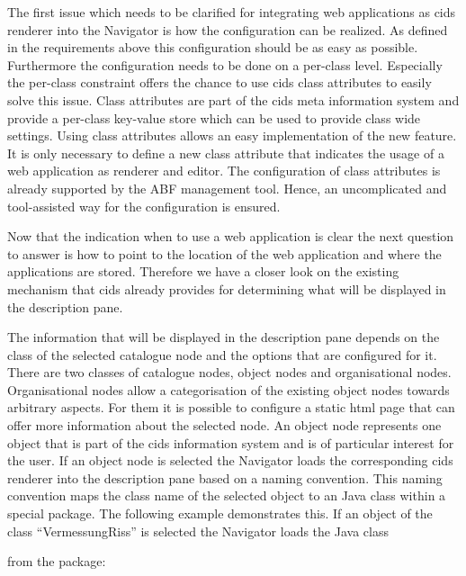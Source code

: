 The first issue which needs to be clarified for integrating web applications as cids renderer into the Navigator is how the configuration can be realized.
As defined in the requirements above this configuration should be as easy as possible.
Furthermore the configuration needs to be done on a per-class level.
Especially the per-class constraint offers the chance to use cids class attributes to easily solve this issue.
Class attributes are part of the cids meta information system and provide a per-class key-value store which can be used to provide class wide settings.
Using class attributes allows an easy implementation of the new feature.
It is only necessary to define a new class attribute that indicates the usage of a web application as renderer and editor.
The configuration of class attributes is already supported by the ABF management tool.
Hence, an uncomplicated and tool-assisted way for the configuration is ensured.

Now that the indication when to use a web application is clear the next question to answer is how to point to the location of the web application and where the applications are stored. Therefore we have a closer look on the existing mechanism that cids already provides for determining what will be displayed in the description pane.

The information that will be displayed in the description pane depends on the class of the selected catalogue node and the options that are configured for it.
There are two classes of catalogue nodes, object nodes and organisational nodes. Organisational nodes allow a categorisation of the existing object nodes towards arbitrary aspects.
For them it is possible to configure a static html page that can offer more information about the selected node.
An object node represents one object that is part of the cids information system and is of particular interest for the user.
 If an object node is selected the Navigator loads the corresponding cids  renderer into the description pane based on a naming convention.
This naming convention maps the class name of the selected object to an Java class within a special package. 
The following example demonstrates this. If an object of the class \enquote{VermessungRiss} is selected the Navigator loads the Java class 

\indent \centerline{}

from the package:  

\indent \centerline{}

